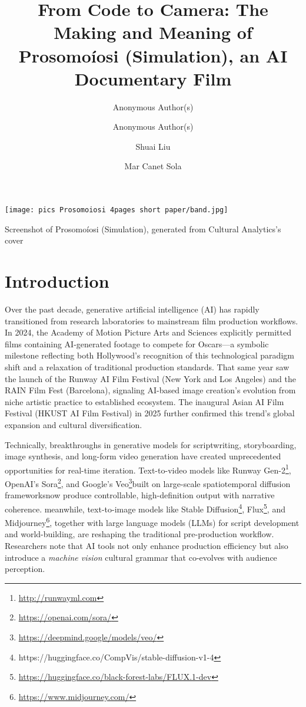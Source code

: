 \documentclass[sigconf,nonacm]{acmart}
\author{Anonymous Author(s)}
\title{From Code to Camera: The Making and Meaning of Prosomoíosi (Simulation), an AI Documentary Film}
\author{Anonymous Author(s)}
\affiliation{%
    \institution{Anonymous Institution}
    \city{Anonymous City}
    \country{Anonymous Country}
  }
\author{Shuai Liu}
\affiliation{%
  \institution{Academy of Media Arts Cologne (KHM)}
  \city{Cologne}
  \country{Germany}}
\author{Mar Canet Sola}
\affiliation{%
  \institution{BFM, Tallinn University, Estonia}
  \city{}
  \country{}}
\affiliation{%
  \institution{Academy of Media Art Cologne(KHM), Germany}
  \city{}
  \country{}}
\begin{document}
\begin{teaserfigure}
    \centering
    \texttt{[image: pics Prosomoiosi 4pages short paper/band.jpg]}
    \caption{Screenshot of Prosomoíosi (Simulation), generated from Cultural Analytics's cover\cite{manovich_cultural_analytics_2020}}
    \label{fig:enter-label}
\end{teaserfigure}


\maketitle

\section{Introduction}

Over the past decade, generative artificial intelligence (AI) has rapidly transitioned from research laboratories to mainstream film production workflows. In 2024, the Academy of Motion Picture Arts and Sciences explicitly permitted films containing AI-generated footage to compete for Oscars—a symbolic milestone reflecting both Hollywood's recognition of this technological paradigm shift and a relaxation of traditional production standards. That same year saw the launch of the Runway AI Film Festival (New York and Los Angeles) and the RAIN Film Fest (Barcelona), signaling AI-based image creation's evolution from niche artistic practice to established ecosystem. The inaugural Asian AI Film Festival (HKUST AI Film Festival) in 2025 further confirmed this trend's global expansion and cultural diversification.

Technically, breakthroughs in generative models for scriptwriting, storyboarding, image synthesis, and long-form video generation have created unprecedented opportunities for real-time iteration. Text-to-video models like Runway Gen-2\footnote{\url{http://runwayml.com}}, OpenAI's Sora\footnote{\url{https://openai.com/sora/}}, and Google's Veo\footnote{\url{https://deepmind.google/models/veo/}}\textemdash built on large-scale spatiotemporal diffusion frameworks\textemdash now produce controllable, high-definition output with narrative coherence. meanwhile, text-to-image models like Stable Diffusion\footnote{https://huggingface.co/CompVis/stable-diffusion-v1-4}, Flux\footnote{\url{https://huggingface.co/black-forest-labs/FLUX.1-dev}}, and Midjourney\footnote{\url{https://www.midjourney.com/}}, together with large language models (LLMs) for script development and world-building, are reshaping the traditional pre-production workflow. Researchers note that AI tools not only enhance production efficiency but also introduce a \emph{machine vision} cultural grammar that co-evolves with audience perception.
\end{document}
